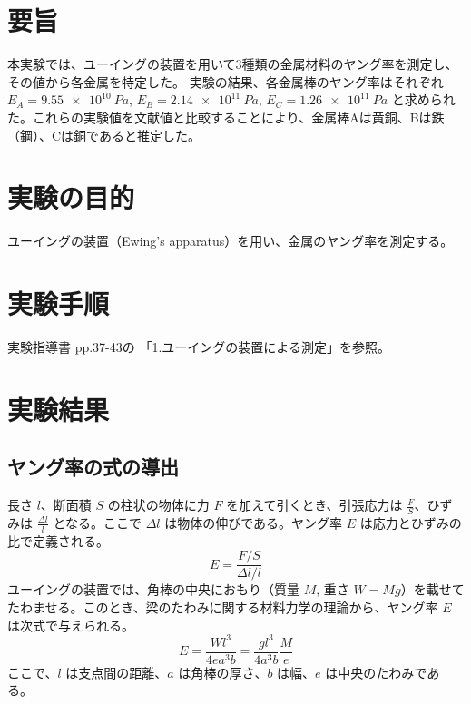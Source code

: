 \documentclass[a4paper,11pt,dvipdfmx]{jsarticle}
\begin{document}
\section{要旨}
本実験では、ユーイングの装置を用いて3種類の金属材料のヤング率を測定し、その値から各金属を特定した。
実験の結果、各金属棒のヤング率はそれぞれ $E_A = \SI{9.55e10}{Pa}$, $E_B = \SI{2.14e11}{Pa}$, $E_C = \SI{1.26e11}{Pa}$ と求められた。これらの実験値を文献値と比較することにより、金属棒Aは黄銅、Bは鉄（鋼）、Cは銅であると推定した。

\section{実験の目的}
ユーイングの装置（Ewing's apparatus）を用い、金属のヤング率を測定する。

\section{実験手順}
実験指導書 pp.37-43の 「1.ユーイングの装置による測定」を参照。

\section{実験結果}
\subsection{ヤング率の式の導出}
長さ $l$、断面積 $S$ の柱状の物体に力 $F$ を加えて引くとき、引張応力は $\frac{F}{S}$、ひずみは $\frac{\Delta l}{l}$ となる。ここで $\Delta l$ は物体の伸びである。ヤング率 $E$ は応力とひずみの比で定義される。
\begin{equation}
    E = \frac{F/S}{\Delta l / l} \label{eq:young_def}
\end{equation}
ユーイングの装置では、角棒の中央におもり（質量 $M$, 重さ $W=Mg$）を載せてたわませる。このとき、梁のたわみに関する材料力学の理論から、ヤング率 $E$ は次式で与えられる。
\begin{equation}
    E = \frac{W l^3}{4e a^3 b} = \frac{g l^3}{4 a^3 b} \frac{M}{e} \label{eq:young_modulus}
\end{equation}
ここで、$l$ は支点間の距離、$a$ は角棒の厚さ、$b$ は幅、$e$ は中央のたわみである。
\end{document}
